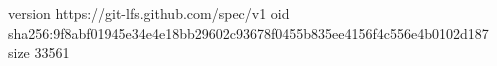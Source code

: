 version https://git-lfs.github.com/spec/v1
oid sha256:9f8abf01945e34e4e18bb29602c93678f0455b835ee4156f4c556e4b0102d187
size 33561
